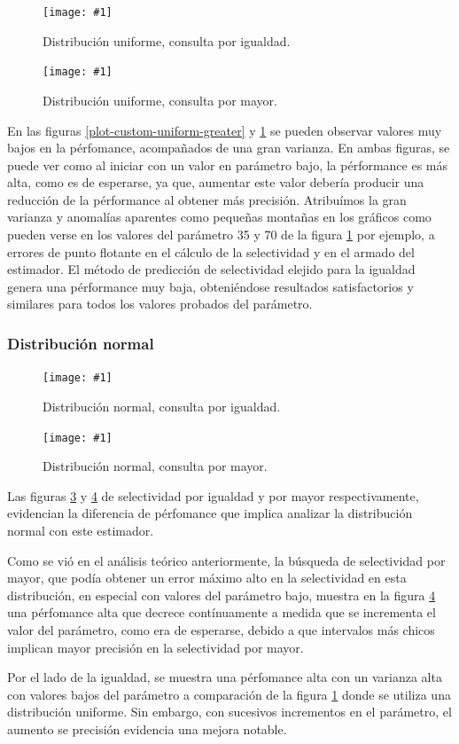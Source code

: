 \documentclass[a4paper, 10pt, twoside]{article}
\newcommand{\grafico}[3]{
  \begin{figure}[H]
    \texttt{[image: \#1]}
    \caption{#2}
    \label{#3}
  \end{figure}
}
\begin{document}
\grafico{plot-hist-uniform-equal}
        {Distribución uniforme, consulta por igualdad.}
        {plot-hist-uniform-equal}
\grafico{plot-hist-uniform-greater}
        {Distribución uniforme, consulta por mayor.}
        {plot-hist-uniform-greater}

En las figuras \ref{plot-custom-uniform-greater} y \ref{plot-hist-uniform-equal} se pueden observar valores muy bajos
en la pérfomance, acompañados de una gran varianza. En ambas figuras, se puede ver como al iniciar con un valor en parámetro bajo,
la pérformance es más alta, como es de esperarse, ya que, aumentar este valor debería producir una reducción de la pérformance al obtener más precisión.
Atribuímos la gran varianza y anomalías aparentes como pequeñas montañas en los gráficos como pueden verse en los
valores del parámetro 35 y 70 de la figura \ref{plot-hist-uniform-equal} por ejemplo, a errores de punto flotante en el cálculo de la selectividad 
y en el armado del estimador.
El método de predicción de selectividad elejido para la igualdad genera una pérformance muy baja, obteniéndose resultados satisfactorios y similares para
todos los valores probados del parámetro.

\subsubsection{Distribución normal}


\grafico{plot-hist-normal-equal}
        {Distribución normal, consulta por igualdad.}
        {plot-hist-normal-equal}
\grafico{plot-hist-normal-greater}
        {Distribución normal, consulta por mayor.}
        {plot-hist-normal-greater}

Las figuras \ref{plot-hist-normal-equal} y \ref{plot-hist-normal-greater} de selectividad por igualdad y por mayor respectivamente, evidencian la diferencia 
de pérfomance que implica analizar la distribución normal con este estimador.

Como se vió en el análisis teórico anteriormente, la búsqueda de selectividad por mayor, que podía obtener un error máximo 
alto en la selectividad en esta distribución, en especial con valores del parámetro bajo, muestra en la figura \ref{plot-hist-normal-greater} una pérfomance alta 
que decrece contínuamente a medida que se incrementa el valor del parámetro, como era de esperarse, debido a que intervalos más chicos implican 
mayor precisión en la selectividad por mayor.

Por el lado de la igualdad, se muestra una pérfomance alta con un varianza alta con valores bajos del parámetro a comparación de la figura \ref{plot-hist-uniform-equal} 
donde se utiliza una distribución uniforme. Sin embargo, con sucesivos incrementos en el parámetro, el aumento se precisión evidencia una mejora notable.   
\end{document}
